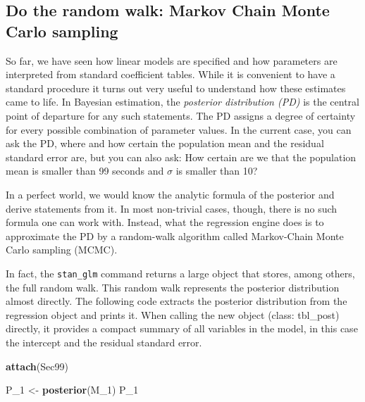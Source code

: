\documentclass[]{svmono}
\newenvironment{Shaded}{\begin{snugshade}}{\end{snugshade}}
\newcommand{\KeywordTok}[1]{\textcolor[rgb]{0.13,0.29,0.53}{\textbf{#1}}}
\newcommand{\DecValTok}[1]{\textcolor[rgb]{0.00,0.00,0.81}{#1}}
\newcommand{\StringTok}[1]{\textcolor[rgb]{0.31,0.60,0.02}{#1}}
\newcommand{\NormalTok}[1]{#1}
\begin{document}
\subsection{Do the random walk: Markov Chain Monte Carlo
sampling}\label{random_walk}

So far, we have seen how linear models are specified and how parameters
are interpreted from standard coefficient tables. While it is convenient
to have a standard procedure it turns out very useful to understand how
these estimates came to life. In Bayesian estimation, the
\emph{posterior distribution (PD)} is the central point of departure for
any such statements. The PD assigns a degree of certainty for every
possible combination of parameter values. In the current case, you can
ask the PD, where and how certain the population mean and the residual
standard error are, but you can also ask: How certain are we that the
population mean is smaller than 99 seconds and \(\sigma\) is smaller
than 10?

In a perfect world, we would know the analytic formula of the posterior
and derive statements from it. In most non-trivial cases, though, there
is no such formula one can work with. Instead, what the regression
engine does is to approximate the PD by a random-walk algorithm called
Markov-Chain Monte Carlo sampling (MCMC).

In fact, the \texttt{stan\_glm} command returns a large object that
stores, among others, the full random walk. This random walk represents
the posterior distribution almost directly. The following code extracts
the posterior distribution from the regression object and prints it.
When calling the new object (class: tbl\_post) directly, it provides a
compact summary of all variables in the model, in this case the
intercept and the residual standard error.

\begin{Shaded}
\begin{Highlighting}[]
\KeywordTok{attach}\NormalTok{(Sec99)}
\end{Highlighting}
\end{Shaded}

\begin{Shaded}
\begin{Highlighting}[]
\NormalTok{P_}\DecValTok{1}\NormalTok{ <-}\StringTok{  }\KeywordTok{posterior}\NormalTok{(M_}\DecValTok{1}\NormalTok{)}
\NormalTok{P_}\DecValTok{1}
\end{Highlighting}
\end{Shaded}
\end{document}
